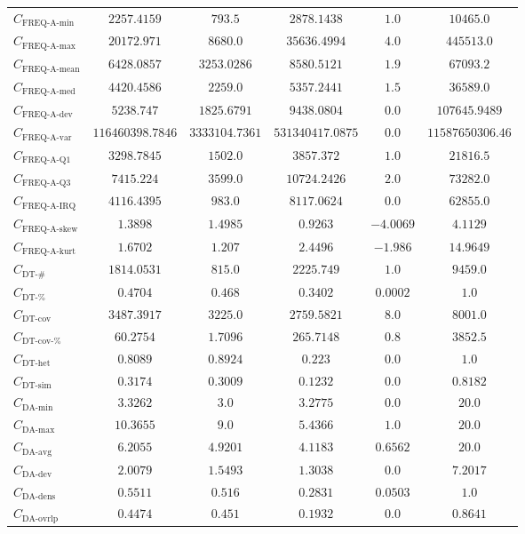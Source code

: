 \documentclass{standalone}
\newcommand{\actfreqminname}{\text{FREQ-A-min}}
\newcommand{\actfreqmin}{C_{\actfreqminname}}
\newcommand{\actfreqmaxname}{\text{FREQ-A-max}}
\newcommand{\actfreqmax}{C_{\actfreqmaxname}}
\newcommand{\actfreqmeanname}{\text{FREQ-A-mean}}
\newcommand{\actfreqmean}{C_{\actfreqmeanname}}
\newcommand{\actfreqmedianname}{\text{FREQ-A-med}}
\newcommand{\actfreqmedian}{C_{\actfreqmedianname}}
\newcommand{\actfreqdevname}{\text{FREQ-A-dev}}
\newcommand{\actfreqdev}{C_{\actfreqdevname}}
\newcommand{\actfreqvarname}{\text{FREQ-A-var}}
\newcommand{\actfreqvar}{C_{\actfreqvarname}}
\newcommand{\actfreqqonename}{\text{FREQ-A-Q1}}
\newcommand{\actfreqqone}{C_{\actfreqqonename}}
\newcommand{\actfreqqthreename}{\text{FREQ-A-Q3}}
\newcommand{\actfreqqthree}{C_{\actfreqqthreename}}
\newcommand{\actfreqiqrname}{\text{FREQ-A-IRQ}}
\newcommand{\actfreqiqr}{C_{\actfreqiqrname}}
\newcommand{\actfreqskewname}{\text{FREQ-A-skew}}
\newcommand{\actfreqskew}{C_{\actfreqskewname}}
\newcommand{\actfreqkurtname}{\text{FREQ-A-kurt}}
\newcommand{\actfreqkurt}{C_{\actfreqkurtname}}
\newcommand{\numberuniquetracesname}{\text{DT-\#}}
\newcommand{\numberuniquetraces}{C_{\numberuniquetracesname}}
\newcommand{\percentageuniquetracesname}{\text{DT-\%}}
\newcommand{\percentageuniquetraces}{C_{\percentageuniquetracesname}}
\newcommand{\dtcovname}{\text{DT-cov}}
\newcommand{\dtcov}{C_{\dtcovname}}
\newcommand{\dtrelcovname}{\text{DT-cov-\%}}
\newcommand{\dtrelcov}{C_{\dtrelcovname}}
\newcommand{\dthetname}{\text{DT-het}}
\newcommand{\dthet}{C_{\dthetname}}
\newcommand{\dtsimname}{\text{DT-sim}}
\newcommand{\dtsim}{C_{\dtsimname}}
\newcommand{\daminname}{\text{DA-min}}
\newcommand{\damin}{C_{\daminname}}
\newcommand{\daavgname}{\text{DA-avg}}
\newcommand{\daavg}{C_{\daavgname}}
\newcommand{\damaxname}{\text{DA-max}}
\newcommand{\damax}{C_{\damaxname}}
\newcommand{\dadevname}{\text{DA-dev}}
\newcommand{\dadev}{C_{\dadevname}}
\newcommand{\dadensname}{\text{DA-dens}}
\newcommand{\dadens}{C_{\dadensname}}
\newcommand{\daoverlapname}{\text{DA-ovrlp}}
\newcommand{\daoverlap}{C_{\daoverlapname}}
\begin{document}
\begin{tabular}{lccccc}
$\actfreqmin$ & $2257.4159$ & $793.5$ & $2878.1438$ & $1.0$ & $10465.0$ \\ 
$\actfreqmax$ & $20172.971$ & $8680.0$ & $35636.4994$ & $4.0$ & $445513.0$ \\ 
$\actfreqmean$ & $6428.0857$ & $3253.0286$ & $8580.5121$ & $1.9$ & $67093.2$ \\ 
$\actfreqmedian$ & $4420.4586$ & $2259.0$ & $5357.2441$ & $1.5$ & $36589.0$ \\ 
$\actfreqdev$ & $5238.747$ & $1825.6791$ & $9438.0804$ & $0.0$ & $107645.9489$ \\ 
$\actfreqvar$ & $116460398.7846$ & $3333104.7361$ & $531340417.0875$ & $0.0$ & $11587650306.46$ \\ 
$\actfreqqone$ & $3298.7845$ & $1502.0$ & $3857.372$ & $1.0$ & $21816.5$ \\ 
$\actfreqqthree$ & $7415.224$ & $3599.0$ & $10724.2426$ & $2.0$ & $73282.0$ \\ 
$\actfreqiqr$ & $4116.4395$ & $983.0$ & $8117.0624$ & $0.0$ & $62855.0$ \\ 
$\actfreqskew$ & $1.3898$ & $1.4985$ & $0.9263$ & $-4.0069$ & $4.1129$ \\ 
$\actfreqkurt$ & $1.6702$ & $1.207$ & $2.4496$ & $-1.986$ & $14.9649$ \\ 
$\numberuniquetraces$ & $1814.0531$ & $815.0$ & $2225.749$ & $1.0$ & $9459.0$ \\ 
$\percentageuniquetraces$ & $0.4704$ & $0.468$ & $0.3402$ & $0.0002$ & $1.0$ \\ 
$\dtcov$ & $3487.3917$ & $3225.0$ & $2759.5821$ & $8.0$ & $8001.0$ \\ 
$\dtrelcov$ & $60.2754$ & $1.7096$ & $265.7148$ & $0.8$ & $3852.5$ \\ 
$\dthet$ & $0.8089$ & $0.8924$ & $0.223$ & $0.0$ & $1.0$ \\ 
$\dtsim$ & $0.3174$ & $0.3009$ & $0.1232$ & $0.0$ & $0.8182$ \\ 
$\damin$ & $3.3262$ & $3.0$ & $3.2775$ & $0.0$ & $20.0$ \\ 
$\damax$ & $10.3655$ & $9.0$ & $5.4366$ & $1.0$ & $20.0$ \\ 
$\daavg$ & $6.2055$ & $4.9201$ & $4.1183$ & $0.6562$ & $20.0$ \\ 
$\dadev$ & $2.0079$ & $1.5493$ & $1.3038$ & $0.0$ & $7.2017$ \\ 
$\dadens$ & $0.5511$ & $0.516$ & $0.2831$ & $0.0503$ & $1.0$ \\ 
$\daoverlap$ & $0.4474$ & $0.451$ & $0.1932$ & $0.0$ & $0.8641$ \\ 

\end{tabular}
\end{document}
